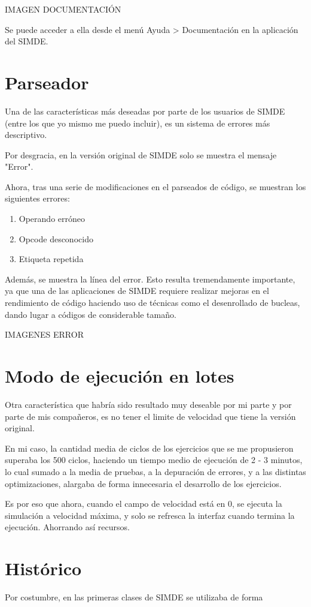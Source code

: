     IMAGEN DOCUMENTACIÓN

\bigskip
Se puede acceder a ella desde el menú Ayuda > Documentación en la aplicación del SIMDE.

\section{Parseador}
\label{6:sec2}

Una de las características más deseadas por parte de los usuarios de SIMDE 
(entre los que yo mismo me puedo incluir), es un sistema de errores más descriptivo. 

Por desgracia, en la versión original de SIMDE solo se muestra el mensaje "Error".

Ahora, tras una serie de modificaciones en el parseados de código, se muestran los siguientes errores:

\begin{enumerate}
\item Operando erróneo
\item Opcode desconocido
\item Etiqueta repetida
\end{enumerate}

Además, se muestra la línea del error. Esto resulta tremendamente importante, 
ya que una de las aplicaciones de SIMDE requiere realizar mejoras en el rendimiento
de código haciendo uso de técnicas como el desenrollado de bucleas, 
dando lugar a códigos de considerable tamaño.

IMAGENES ERROR


\section{Modo de ejecución en lotes}
\label{6:sec3}

Otra característica que habría sido resultado muy deseable por mi parte y por parte de mis compañeros, 
es no tener el limite de velocidad que tiene la versión original.

En mi caso, la cantidad media de ciclos de los ejercicios que se me propusieron superaba los 500 ciclos,
 haciendo un tiempo medio de ejecución de 2 - 3 minutos, lo cual sumado a 
la media de pruebas, a la depuración de errores, y a las distintas optimizaciones, 
alargaba de forma innecesaria el desarrollo de los ejercicios.

Es por eso que ahora, cuando el campo de velocidad está en 0, se ejecuta la simulación a velocidad 
máxima, y solo se refresca la interfaz cuando termina la ejecución. Ahorrando así 
recursos. 

\section{Histórico}
\label{6:sec4}

Por costumbre, en las primeras clases de SIMDE se utilizaba de forma 